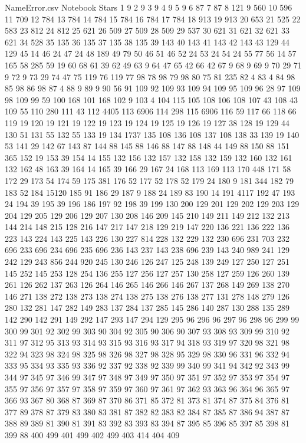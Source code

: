 \begin{filecontents}{NameError.csv}
Notebook Stars
1	9
2	9
3	9
4	9
5	9
6	87
7	87
8	121
9	560
10	596
11	709
12	784
13	784
14	784
15	784
16	784
17	784
18	913
19	913
20	653
21	525
22	583
23	812
24	812
25	621
26	509
27	509
28	509
29	537
30	621
31	621
32	621
33	621
34	528
35	135
36	135
37	135
38	135
39	143
40	143
41	143
42	143
43	129
44	129
45	14
46	24
47	24
48	189
49	79
50	46
51	46
52	24
53	24
54	24
55	77
56	14
57	165
58	285
59	19
60	68
61	39
62	49
63	9
64	47
65	42
66	42
67	9
68	9
69	9
70	29
71	9
72	9
73	29
74	47
75	119
76	119
77	98
78	98
79	98
80	75
81	235
82	4
83	4
84	98
85	98
86	98
87	4
88	9
89	9
90	56
91	109
92	109
93	109
94	109
95	109
96	28
97	109
98	109
99	59
100	168
101	168
102	9
103	4
104	115
105	108
106	108
107	43
108	43
109	55
110	280
111	43
112	4405
113	6906
114	298
115	6906
116	59
117	66
118	66
119	19
120	19
121	19
122	19
123	19
124	19
125	19
126	19
127	38
128	19
129	44
130	51
131	55
132	55
133	19
134	1737
135	108
136	108
137	108
138	33
139	19
140	53
141	29
142	67
143	87
144	88
145	88
146	88
147	88
148	44
149	88
150	88
151	365
152	19
153	39
154	14
155	132
156	132
157	132
158	132
159	132
160	132
161	132
162	48
163	39
164	14
165	39
166	29
167	24
168	113
169	113
170	448
171	58
172	29
173	54
174	59
175	381
176	52
177	52
178	52
179	24
180	9
181	344
182	79
183	52
184	15120
185	91
186	29
187	9
188	24
189	83
190	14
191	4117
192	47
193	24
194	39
195	39
196	186
197	92
198	39
199	130
200	129
201	129
202	129
203	129
204	129
205	129
206	129
207	130
208	146
209	145
210	149
211	149
212	132
213	144
214	148
215	128
216	147
217	147
218	129
219	147
220	136
221	136
222	136
223	143
224	143
225	143
226	130
227	814
228	132
229	132
230	696
231	703
232	696
233	696
234	696
235	696
236	143
237	143
238	696
239	143
240	989
241	129
242	129
243	856
244	920
245	130
246	126
247	125
248	139
249	127
250	127
251	145
252	145
253	128
254	136
255	127
256	127
257	130
258	127
259	126
260	139
261	126
262	137
263	126
264	146
265	146
266	146
267	137
268	149
269	138
270	146
271	138
272	138
273	138
274	138
275	138
276	138
277	131
278	148
279	126
280	132
281	147
282	149
283	137
284	137
285	145
286	140
287	130
288	135
289	142
290	142
291	149
292	147
293	147
294	129
295	96
296	96
297	96
298	96
299	99
300	99
301	92
302	99
303	90
304	92
305	90
306	90
307	93
308	93
309	99
310	92
311	97
312	95
313	93
314	93
315	93
316	93
317	94
318	93
319	97
320	98
321	98
322	94
323	98
324	98
325	98
326	98
327	98
328	95
329	98
330	96
331	96
332	94
333	95
334	93
335	93
336	92
337	92
338	92
339	99
340	99
341	94
342	92
343	99
344	97
345	97
346	99
347	97
348	97
349	97
350	97
351	97
352	97
353	97
354	97
355	97
356	97
357	97
358	97
359	97
360	97
361	97
362	93
363	96
364	96
365	97
366	93
367	80
368	87
369	87
370	86
371	85
372	81
373	81
374	87
375	84
376	81
377	89
378	87
379	83
380	83
381	87
382	82
383	82
384	87
385	87
386	94
387	87
388	89
389	81
390	81
391	83
392	83
393	83
394	87
395	85
396	85
397	85
398	81
399	88
400	499
401	499
402	499
403	414
404	409
\end{filecontents}
